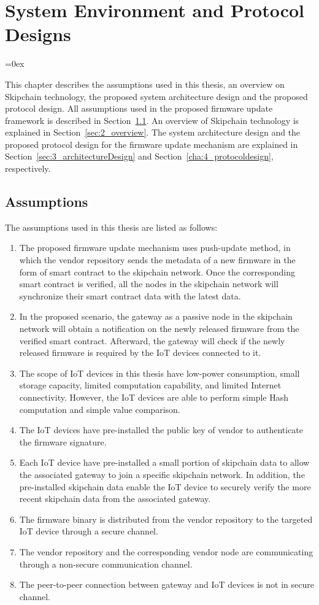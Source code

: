 \chapter{System Environment and Protocol Designs}
\label{cha:3_design}
\parskip=0ex

\indent This chapter describes the assumptions used in this thesis, an overview on Skipchain technology, the proposed system architecture design and the proposed protocol design. All assumptions used in the proposed firmware update framework is described in Section~\ref{sec:1_assumptions}. An overview of Skipchain technology is explained in Section~\ref{sec:2_overview}. The system architecture design and the proposed protocol design for the firmware update mechanism are explained in Section~\ref{sec:3_architectureDesign} and Section~\ref{cha:4_protocoldesign}, respectively.

\section{Assumptions}
\label{sec:1_assumptions}

The assumptions used in this thesis are listed as follows:
\begin{enumerate}
	\item The proposed firmware update mechanism uses push-update method, in which the vendor repository sends the metadata of a new firmware in the form of smart contract to the skipchain network. Once the corresponding smart contract is verified, all the nodes in the skipchain network will synchronize their smart contract data with the latest data.
	\item  In the proposed scenario, the gateway as a passive node in the skipchain network will obtain a notification on the newly released firmware from the verified smart contract. Afterward, the gateway will check if the newly released firmware is required by the IoT devices connected to it.
	\item The scope of IoT devices in this thesis have low-power consumption, small storage capacity, limited computation capability, and limited Internet connectivity. However, the IoT devices are able to perform simple Hash computation and simple value comparison.
	\item The IoT devices have pre-installed the public key of vendor to authenticate the firmware signature.
	\item Each IoT device have pre-installed a small portion of skipchain data to allow the associated gateway to join a specific skipchain network. In addition, the pre-installed skipchain data enable the IoT device to securely verify the more recent skipchain data from the associated gateway.
	\item The firmware binary is distributed from the vendor repository to the targeted IoT device through a secure channel.
	\item The vendor repository and the corresponding vendor node are communicating through a non-secure communication channel.
	\item The peer-to-peer connection between gateway and IoT devices is not in secure channel.
\end{enumerate}

